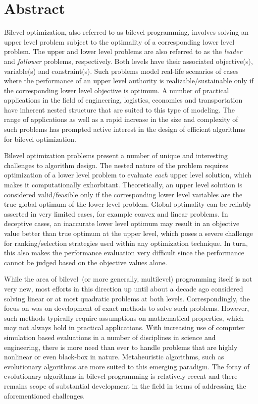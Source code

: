 \chapter*{Abstract}
\pagestyle{plain}


Bilevel optimization, also referred to as bilevel programming, involves solving an upper level problem subject to the optimality of a corresponding lower level problem. The upper and lower level problems are also referred to as the \textit{leader} and \textit{follower} problems, respectively. Both levels have their associated objective(s), variable(s) and constraint(s). Such problems model real-life scenarios of cases where the performance of an upper level authority is realizable/sustainable only if the corresponding lower level objective is optimum. A number of practical applications in the field of engineering, logistics, economics and transportation have inherent nested structure that are suited to this type of modeling. The range of applications as well as a rapid increase in the size and complexity of such problems has prompted active interest in the design of efficient algorithms for bilevel optimization. 

Bilevel optimization problems present a number of unique and interesting challenges to algorithm design. The nested nature of the problem requires optimization of a lower level problem to evaluate \emph{each} upper level solution, which makes it computationally exhorbitant. Theoretically, an upper level solution is considered valid/feasible only if the corresponding lower level variables are the true global optimum of the lower level problem. Global optimality can be reliably asserted in very limited cases, for example convex and linear problems. In deceptive cases, an inaccurate lower level optimum may result in an objective value better than true optimum at the upper level, which poses a severe challenge for ranking/selection strategies used within any optimization technique. In turn, this also makes the performance evaluation very difficult since the performance cannot be judged based on the objective values alone. 

While the area of bilevel~(or more generally, multilevel) programming itself is not very new, most efforts in this direction up until about a decade ago considered solving linear or at most quadratic problems at both levels. Correspondingly, the focus on was on development of exact methods to solve such problems. However, such methods typically require assumptions on mathematical properties, which may not always hold in practical applications. With increasing use of computer simulation based evaluations in a number of disciplines in science and engineering, there is more need than ever to handle problems that are highly nonlinear or even black-box in nature. Metaheuristic algorithms, such as evolutionary algorithms are more suited to this emerging paradigm. The foray of evolutionary algorithms in bilevel programming is relatively recent and there remains scope of substantial development in the field in terms of addressing the aforementioned challenges.  

